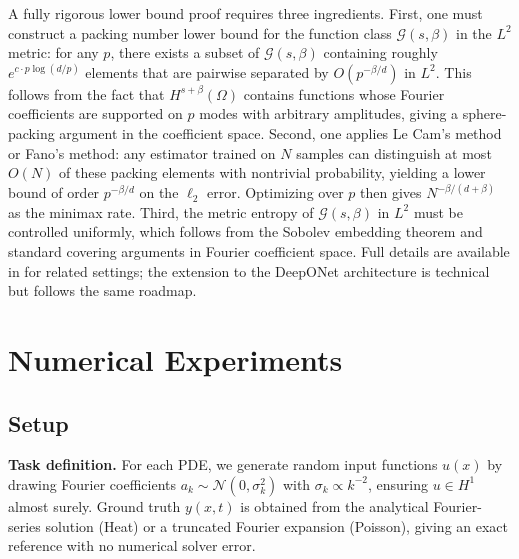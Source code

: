 \documentclass[12pt,a4paper]{article}
\begin{document}
A fully rigorous lower bound proof requires three ingredients.  First, one must
construct a packing number lower bound for the function class $\mathcal{G}(s,\beta)$
in the $L^2$ metric: for any $p$, there exists a subset of $\mathcal{G}(s,\beta)$
containing roughly $e^{c \cdot p \log(d/p)}$ elements that are pairwise separated
by $O(p^{-\beta/d})$ in $L^2$.  This follows from the fact that $H^{s+\beta}(\Omega)$
contains functions whose Fourier coefficients are supported on $p$ modes with
arbitrary amplitudes, giving a sphere-packing argument in the coefficient space.
Second, one applies Le Cam's method or Fano's method: any estimator trained on
$N$ samples can distinguish at most $O(N)$ of these packing elements with
nontrivial probability, yielding a lower bound of order $p^{-\beta/d}$ on the
$\ell_2$ error.  Optimizing over $p$ then gives $N^{-\beta/(d+\beta)}$ as the
minimax rate.  Third, the metric entropy of $\mathcal{G}(s,\beta)$ in $L^2$ must
be controlled uniformly, which follows from the Sobolev embedding theorem and
standard covering arguments in Fourier coefficient space.  Full details are
available in \citet{bouchard2023minimax,brugiapaglia2026tour} for related settings;
the extension to the DeepONet architecture is technical but follows the same
roadmap.

\section{Numerical Experiments}
\label{sec:experiments}

\subsection{Setup}

\textbf{Task definition.}  For each PDE, we generate random input functions
$u(x)$ by drawing Fourier coefficients $a_k \sim \mathcal{N}(0, \sigma_k^2)$
with $\sigma_k \propto k^{-2}$, ensuring $u \in H^1$ almost surely.
Ground truth $y(x,t)$ is obtained from the analytical Fourier-series
solution (Heat) or a truncated Fourier expansion (Poisson), giving an exact
reference with no numerical solver error.
\end{document}
